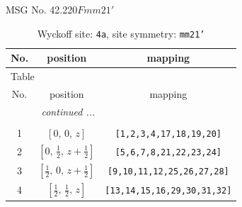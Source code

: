 \documentclass[fleqn,8pt]{jsarticle}
\begin{document}
\setcounter{MaxMatrixCols}{32}

\renewcommand{\tablename}{Table~}
\renewcommand{\figurename}{Figure~}
\begin{center}
\LARGE
MSG No. 42.220\quad$Fmm21'$
\end{center}
\renewcommand{\arraystretch}{1.2}
\begin{longtable}{ccc}
\caption{Wyckoff site: {\tt 4a}, site symmetry: {\tt mm21'}}
 \\
 \hline \hline
No. & position & mapping \\ \hline \endfirsthead

\multicolumn{2}{l}{\tablename\ \thetable{}} \\
 \hline \hline
No. & position & mapping \\ \hline \endhead

 \hline \hline
\multicolumn{2}{r}{\footnotesize\it continued ...} \\ \endfoot

 \hline \hline
\multicolumn{2}{r}{} \\ \endlastfoot

1 & $\left[ 0,\, 0,\, z \right]$ & {\tt [1,2,3,4,17,18,19,20]} \\ \hline
2 & $\left[ 0,\, \frac{1}{2},\, z + \frac{1}{2} \right]$ & {\tt [5,6,7,8,21,22,23,24]} \\ \hline
3 & $\left[ \frac{1}{2},\, 0,\, z + \frac{1}{2} \right]$ & {\tt [9,10,11,12,25,26,27,28]} \\ \hline
4 & $\left[ \frac{1}{2},\, \frac{1}{2},\, z \right]$ & {\tt [13,14,15,16,29,30,31,32]} \\
\end{longtable}
\renewcommand{\arraystretch}{1.2}
\end{document}
